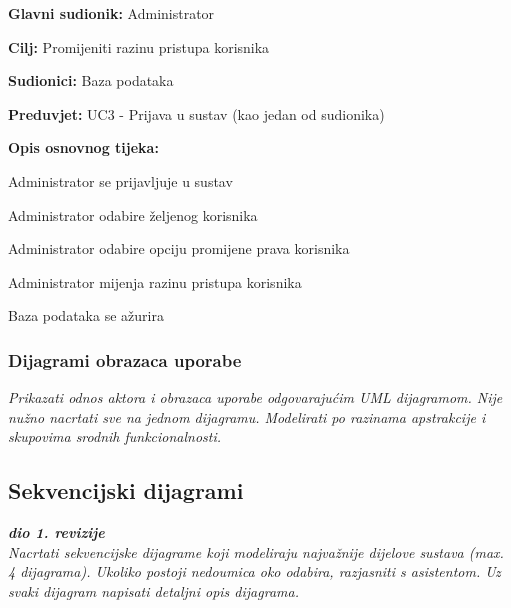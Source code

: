 					\noindent {}
					\begin{packed_item}
	
						\item \textbf{Glavni sudionik: } Administrator
						\item  \textbf{Cilj:} Promijeniti razinu pristupa korisnika
						\item  \textbf{Sudionici:} Baza podataka
						\item  \textbf{Preduvjet:} UC3 - Prijava u sustav (kao jedan od sudionika)
						\item  \textbf{Opis osnovnog tijeka:}
						
						\item[] \begin{packed_enum}
							
							\item Administrator se prijavljuje u sustav
							\item Administrator odabire željenog korisnika
							\item Administrator odabire opciju promijene prava korisnika
							\item Administrator mijenja razinu pristupa korisnika
							\item Baza podataka se ažurira
						\end{packed_enum}
					\end{packed_item}
				
					
				\subsubsection{Dijagrami obrazaca uporabe}
					
					\textit{Prikazati odnos aktora i obrazaca uporabe odgovarajućim UML dijagramom. Nije nužno nacrtati sve na jednom dijagramu. Modelirati po razinama apstrakcije i skupovima srodnih funkcionalnosti.}
				\eject		
				
			\subsection{Sekvencijski dijagrami}
				
				\textbf{\textit{dio 1. revizije}}\\
				
				\textit{Nacrtati sekvencijske dijagrame koji modeliraju najvažnije dijelove sustava (max. 4 dijagrama). Ukoliko postoji nedoumica oko odabira, razjasniti s asistentom. Uz svaki dijagram napisati detaljni opis dijagrama.}
				\eject
	
